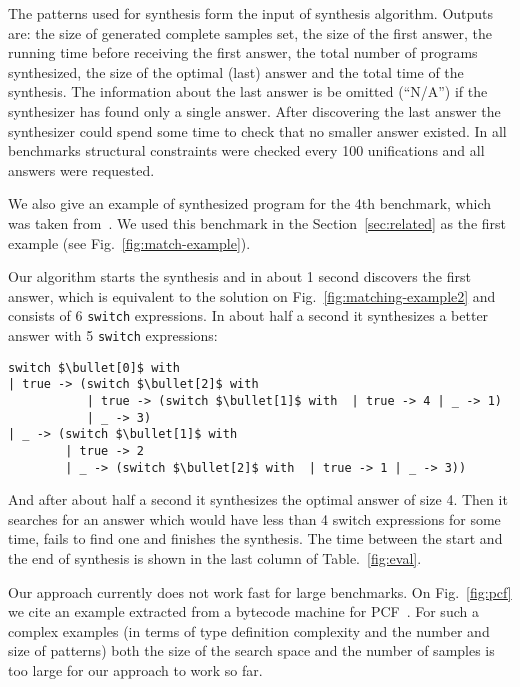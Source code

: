 The patterns used for synthesis form the input of synthesis algorithm.
Outputs are: the size of generated complete samples set, the size of the first answer, the running time before receiving the
first answer, the total number of programs synthesized, the size of the optimal (last) answer and the total time of the synthesis.
The information about the last answer is be omitted (``N/A'') if the synthesizer has found only a single answer. After discovering
the last answer
the synthesizer could spend some time to check that no smaller answer existed.
In all benchmarks structural constraints were checked every 100 unifications and all answers were requested.

We also give an example of synthesized program for the 4th benchmark, which was taken from~\cite{maranget2008}. We used this benchmark in the Section~\ref{sec:related} as the first example (see Fig.~\ref{fig:match-example}).

Our algorithm starts the
synthesis and in about 1 second discovers the first answer, which is equivalent to the solution on Fig.~\ref{fig:matching-example2} and
consists of 6 \lstinline|switch| expressions. In about half a second it synthesizes a better answer with 5 \lstinline|switch| expressions:

\begin{lstlisting}
switch $\bullet[0]$ with
| true -> (switch $\bullet[2]$ with  
           | true -> (switch $\bullet[1]$ with  | true -> 4 | _ -> 1)
           | _ -> 3)
| _ -> (switch $\bullet[1]$ with  
        | true -> 2
        | _ -> (switch $\bullet[2]$ with  | true -> 1 | _ -> 3))
\end{lstlisting}

And after about half a second it synthesizes the optimal answer of size 4. Then it searches for an answer which would have less than 4 switch expressions
for some time, fails to find one and finishes the synthesis. 
The time between the start and the end of synthesis is shown in the last column of Table.~\ref{fig:eval}.

Our approach currently does not work fast for large benchmarks. On Fig.~\ref{fig:pcf} we cite an example extracted from a bytecode
machine for PCF~\cite{maranget2008,Plotkin1977LCFCA}. For such a complex examples (in terms of type definition complexity and the number and size of patterns)
both the size of the search space and the number of samples is too large for our approach to work so far.

